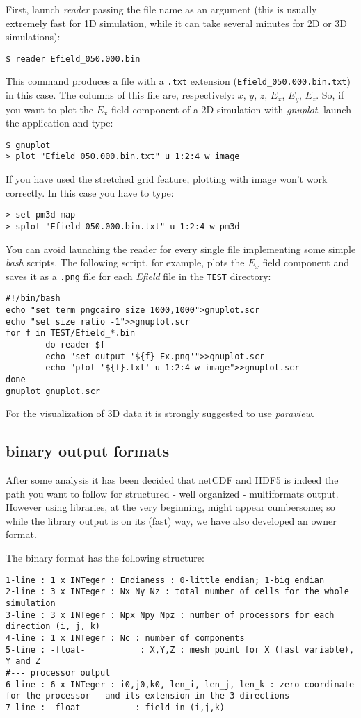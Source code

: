 \documentclass[11pt,a4paper]{report}
\begin{document}
First, launch \emph{reader} passing the file name as an argument (this is usually extremely fast for 1D simulation, while it can take several minutes for 2D or 3D simulations):
\begin{verbatim}
$ reader Efield_050.000.bin
\end{verbatim}
This command produces a file with a \verb+.txt+ extension (\verb+Efield_050.000.bin.txt+) in this case. The columns of this file are, respectively: $x$, $y$, $z$, $E_x$, $E_y$, $E_z$. So, if you want to plot the $E_x$ field component of a 2D simulation with \emph{gnuplot}, launch the application and type:
\begin{verbatim}
$ gnuplot
> plot "Efield_050.000.bin.txt" u 1:2:4 w image
\end{verbatim}
If you have used the stretched grid feature, plotting with image won't work correctly. In this case you have to type:
\begin{verbatim}
> set pm3d map
> splot "Efield_050.000.bin.txt" u 1:2:4 w pm3d
\end{verbatim}
You can avoid launching the reader for every single file implementing some simple \emph{bash} scripts. The following script, for example, plots the 
$E_x$ field component and saves it as a \verb+.png+ file for each \emph{Efield} file in the \verb+TEST+ directory:
\begin{verbatim}
#!/bin/bash
echo "set term pngcairo size 1000,1000">gnuplot.scr
echo "set size ratio -1">>gnuplot.scr
for f in TEST/Efield_*.bin
        do reader $f
        echo "set output '${f}_Ex.png'">>gnuplot.scr
        echo "plot '${f}.txt' u 1:2:4 w image">>gnuplot.scr 
done
gnuplot gnuplot.scr
\end{verbatim}
For the visualization of 3D data it is strongly suggested to use \emph{paraview}.

\subsection{binary output formats}
After some analysis it has been decided that netCDF and HDF5 is indeed the path you want to follow for structured - well organized - multiformats output.
However using libraries, at the very beginning, might appear cumbersome; so while the library output is on its (fast) way, we have also developed an owner format.

The binary format has the following structure:
\begin{verbatim}
1-line : 1 x INTeger : Endianess : 0-little endian; 1-big endian
2-line : 3 x INTeger : Nx Ny Nz : total number of cells for the whole simulation
3-line : 3 x INTeger : Npx Npy Npz : number of processors for each direction (i, j, k)
4-line : 1 x INTeger : Nc : number of components
5-line : -float-           : X,Y,Z : mesh point for X (fast variable), Y and Z
#--- processor output
6-line : 6 x INTeger : i0,j0,k0, len_i, len_j, len_k : zero coordinate for the processor - and its extension in the 3 directions
7-line : -float-          : field in (i,j,k)
\end{verbatim}
\end{document}
